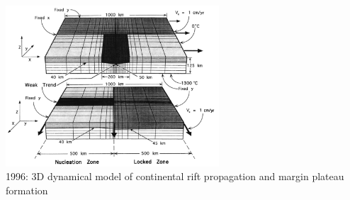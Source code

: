 \begin{center}
\includegraphics[height=6cm]{images/history/dusa96}\\
{\small 1996: 3D dynamical model of continental rift propagation and 
margin plateau formation \cite{dusa96}}
\end{center}

